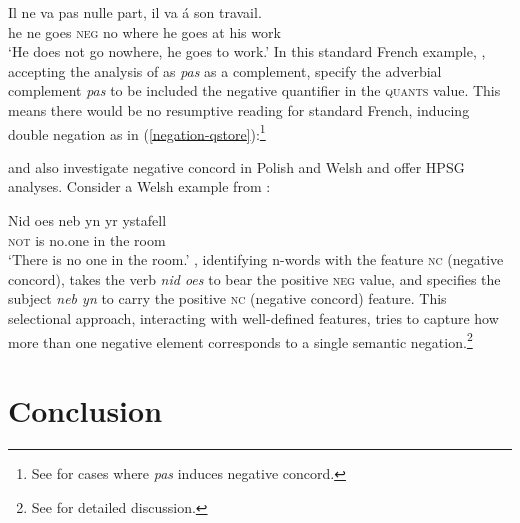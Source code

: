 \documentclass[output=paper
                ,modfonts
                ,nonflat
	        ,collection
	        ,collectionchapter
	        ,collectiontoclongg
 	        ,biblatex
                ,babelshorthands
                ,newtxmath
                ,draftmode
                ,colorlinks, citecolor=brown
]{./langsci/langscibook}
\begin{document}
{\begin{exe}
\begin{xlist}
\ea
\gll Il ne va pas nulle part,         il va \'{a} son travail.\\
     he ne goes \textsc{neg} no where he goes at  his work\\
\glt `He does not go nowhere, he goes to work.'
\z
%
In this standard French example, \citet{Swart:02}, accepting
the analysis of \citet{Kim:00} as \textit{pas} as a complement,
specify the adverbial complement \emph{pas} to be included the negative quantifier in the \textsc{quants} value.
 This means there would be no resumptive
reading for standard French, inducing double negation as in (\ref{negation-qstore}):\footnote{See \citet{Swart:02} for cases where \textit{pas} induces negative concord.}

\ea
\label{negation-qstore}
\z

\citet{PK:99} and \citet{BJ:00} also  investigate negative concord in Polish and Welsh
and offer HPSG analyses. Consider a Welsh example from \citet{BJ:00}:

\ea
\gll Nid         oes neb yn yr ystafell\\
\textsc{not}    is no.one in the room\\
\glt `There is no one in the room.'
\z
\noindent \citet{BJ:00}, identifying n-words with the feature
\textsc{nc} (negative
concord),  takes the verb \emph{nid oes} to bear the positive \textsc{neg} value,
and specifies the subject \emph{neb yn} to carry the positive \textsc{nc} (negative
concord) feature. This selectional approach, interacting with
well-defined features, tries to capture how more than one
negative element corresponds to a single semantic negation.\footnote{See
\citet{BJ:00} for detailed discussion.}



\section{Conclusion}





\end{xlist}
\end{exe}}
\end{document}
